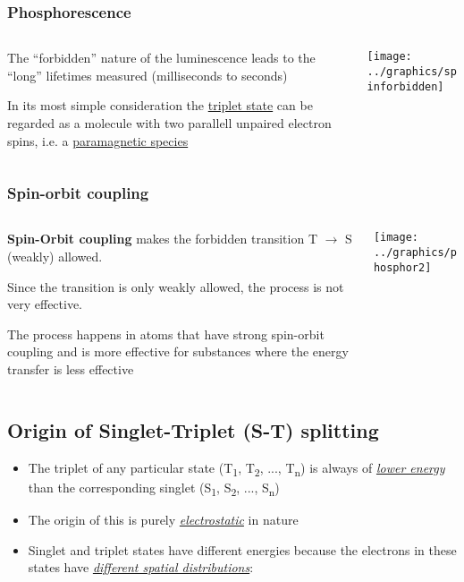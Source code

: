 \documentclass[ignorenonframetext]{beamer}
\begin{document}
\begin{frame}
\frametitle{Phosphorescence}
\begin{columns}[onlytextwidth]
\begin{column}{.5\textwidth}
The ``forbidden'' nature of the luminescence leads to the ``long'' lifetimes measured (milliseconds to seconds)

In its most simple consideration the \underline{triplet state} can be regarded as a molecule with two parallell unpaired electron spins, i.e. a \underline{paramagnetic species}

\end{column}
\begin{column}{.5\textwidth}

\texttt{[image: ../graphics/spinforbidden]}

\end{column}
\end{columns}
\end{frame}

\begin{frame}
\frametitle{Spin-orbit coupling}
\begin{columns}[onlytextwidth]
\begin{column}{.5\textwidth}
\textbf{Spin-Orbit coupling} makes the forbidden transition T \(\rightarrow\) S (weakly) allowed.

Since the transition is only weakly allowed, the process is not very effective.

The process happens in atoms that have strong spin-orbit coupling and is more effective for substances where the energy transfer is less effective

\end{column}
\begin{column}{.5\textwidth}

\texttt{[image: ../graphics/phosphor2]}
\end{column}
\end{columns}
\end{frame}

\subsection{Origin of Singlet-Triplet (S-T) splitting}
\begin{frame}
\begin{itemize}
\item The triplet of any particular state (T\textsubscript{1}, T\textsubscript{2}, ..., T\textsubscript{n}) is always of \textit{\underline{lower energy}} than the corresponding singlet (S\textsubscript{1}, S\textsubscript{2}, ..., S\textsubscript{n})
\item The origin of this is purely \textit{\underline{electrostatic}} in nature
\item Singlet and triplet states have different energies because the electrons in these states have \textit{\underline{different spatial distributions}}: 	
\end{itemize}
\end{frame}
\end{document}
